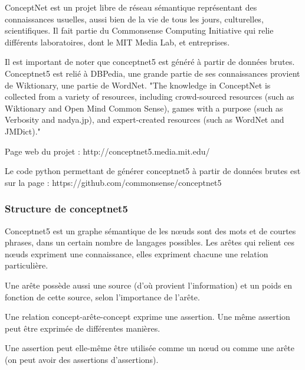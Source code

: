 \documentclass{article}           %
\begin{document}
ConceptNet est un projet libre de réseau sémantique représentant des connaissances usuelles, aussi bien de la vie de tous les jours, culturelles, scientifiques. Il fait partie du Commonsense Computing Initiative qui relie différents laboratoires, dont le MIT Media Lab, et entreprises.

Il est important de noter que conceptnet5 est généré à partir de données brutes. Conceptnet5 est relié à DBPedia, une grande partie de ses connaissances provient de Wiktionary, une partie de WordNet.
"The knowledge in ConceptNet is collected from a variety of resources, including crowd-sourced resources (such as Wiktionary and Open Mind Common Sense), games with a purpose (such as Verbosity and nadya.jp), and expert-created resources (such as WordNet and JMDict)."

Page web du projet :
http://conceptnet5.media.mit.edu/

Le code python permettant de générer conceptnet5 à partir de données brutes est sur la page :
https://github.com/commonsense/conceptnet5

\subsubsection{Structure de conceptnet5}

Conceptnet5 est un graphe sémantique de 
les n\oe uds sont des mots et de courtes phrases, dans un certain nombre de langages possibles. Les arêtes qui relient ces n\oe uds expriment une connaissance, elles expriment chacune une relation particulière.

Une arête possède aussi une source (d'où provient l'information) et un poids en fonction de cette source, selon l'importance de l'arête.

Une relation concept-arête-concept exprime une assertion. Une même assertion peut être exprimée de différentes manières.

Une assertion peut elle-même être utilisée comme un n\oe ud ou comme une arête (on peut avoir des assertions d'assertions).
\end{document}
